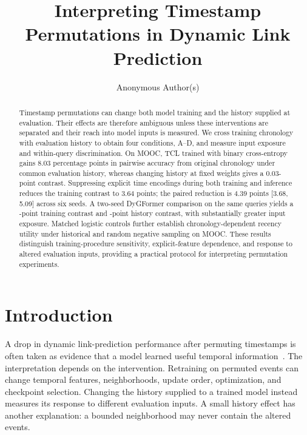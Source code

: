 \documentclass[sigconf,anonymous,review]{acmart}
\begin{document}
\title{Interpreting Timestamp Permutations in Dynamic Link Prediction}
\author{Anonymous Author(s)}

\begin{abstract}
Timestamp permutations can change both model training and the history supplied at evaluation. Their effects are therefore ambiguous unless these interventions are separated and their reach into model inputs is measured. We cross training chronology with evaluation history to obtain four conditions, A--D, and measure input exposure and within-query discrimination. On MOOC, TCL trained with binary cross-entropy gains 8.03 percentage points in pairwise accuracy from original chronology under common evaluation history, whereas changing history at fixed weights gives a 0.03-point contrast. Suppressing explicit time encodings during both training and inference reduces the training contrast to 3.64 points; the paired reduction is 4.39 points [3.68, 5.09] across six seeds. A two-seed DyGFormer comparison on the same queries yields a \DyGTraining{}-point training contrast and \DyGHistory{}-point history contrast, with substantially greater input exposure. Matched logistic controls further establish chronology-dependent recency utility under historical and random negative sampling on MOOC. These results distinguish training-procedure sensitivity, explicit-feature dependence, and response to altered evaluation inputs, providing a practical protocol for interpreting permutation experiments.
\end{abstract}
\maketitle

\section{Introduction}
A drop in dynamic link-prediction performance after permuting timestamps is often taken as evidence that a model learned useful temporal information~\cite{rahman2025counterfactual}. The interpretation depends on the intervention. Retraining on permuted events can change temporal features, neighborhoods, update order, optimization, and checkpoint selection. Changing the history supplied to a trained model instead measures its response to different evaluation inputs. A small history effect has another explanation: a bounded neighborhood may never contain the altered events.
\end{document}
